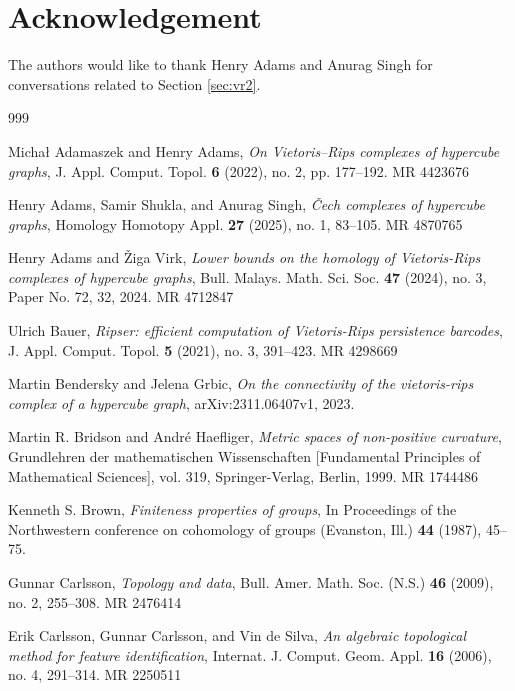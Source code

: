 \documentclass{amsart}
\theoremstyle{definition}
\theoremstyle{remark}
\numberwithin{equation}{section}
\begin{document}
\section{Acknowledgement}

The authors would like to thank Henry Adams and Anurag Singh for conversations related to Section \ref{sec:vr2}.

 {\begin{thebibliography}{999}


 Micha\l \hspace{0.1em} Adamaszek and Henry Adams, {\em On Vietoris–Rips complexes of hypercube graphs},  J. Appl. Comput. Topol. {\bf 6} (2022), no. 2, pp. 177--192. MR 4423676

 Henry Adams, Samir Shukla, and Anurag Singh, {\em \v{C}ech complexes of hypercube graphs}, Homology Homotopy Appl. {\bf 27} (2025), no. 1, 83--105. MR 4870765



Henry Adams and \v{Z}iga Virk, {\em Lower bounds on the homology of Vietoris-Rips complexes of hypercube graphs}, Bull. Malays. Math. Sci. Soc. {\bf 47} (2024), no. 3, Paper No. 72, 32, 2024. MR 4712847

Ulrich Bauer, {\em Ripser: efficient computation of Vietoris-Rips persistence barcodes}, J. Appl. Comput. Topol. {\bf 5} (2021), no. 3, 391--423.  MR 4298669

Martin Bendersky and Jelena Grbic, {\em On the connectivity of the vietoris-rips complex
of a hypercube graph}, arXiv:2311.06407v1, 2023.

Martin R. Bridson and André Haefliger, {\em Metric spaces of non-positive curvature}, Grundlehren der mathematischen Wissenschaften [Fundamental Principles of Mathematical Sciences], vol. 319, Springer-Verlag, Berlin, 1999. MR 1744486

Kenneth S. Brown, {\em Finiteness properties of groups}, In Proceedings of the Northwestern
conference on cohomology of groups (Evanston, Ill.) {\bf 44} (1987), 45--75.

Gunnar Carlsson, {\em Topology and data}, Bull. Amer. Math. Soc. (N.S.) {\bf 46} (2009), no. 2, 255--308. MR 2476414

Erik Carlsson, Gunnar Carlsson, and Vin de Silva, {\em An algebraic topological method
for feature identification}, Internat. J. Comput. Geom. Appl. {\bf 16} (2006), no. 4, 291--314. MR 2250511


\end{thebibliography}}
\end{document}
